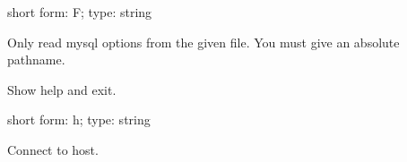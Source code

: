 \documentclass[letterpaper,10pt,english]{sphinxmanual}
\begin{document}
\begin{fulllineitems}
\label{\detokenize{mariadb-config-diff:cmdoption-mariadb-config-diff-defaults-file}}
\sphinxAtStartPar
short form: \sphinxhyphen{}F; type: string

\sphinxAtStartPar
Only read mysql options from the given file.  You must give an absolute
pathname.

\end{fulllineitems}


\begin{fulllineitems}
\label{\detokenize{mariadb-config-diff:cmdoption-mariadb-config-diff-help}}
\sphinxAtStartPar
Show help and exit.

\end{fulllineitems}


\begin{fulllineitems}
\label{\detokenize{mariadb-config-diff:cmdoption-mariadb-config-diff-host}}
\sphinxAtStartPar
short form: \sphinxhyphen{}h; type: string

\sphinxAtStartPar
Connect to host.

\end{fulllineitems}
\end{document}
